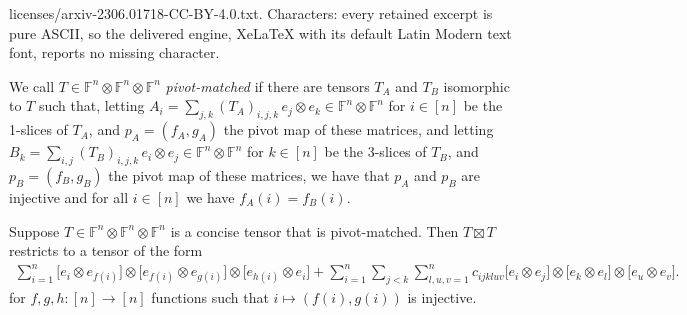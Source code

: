 \documentclass[10pt,a4paper]{amsart}
\newcommand{\FF}{\mathbb{F}}
\begin{document}
licenses/arxiv-2306.01718-CC-BY-4.0.txt. Characters: every retained excerpt is pure ASCII, so the delivered engine, XeLaTeX with its default Latin Modern text font, reports no missing character.
\begin{definition} \label{def:pivot-matched}
    We call $T\in\FF^{n}\otimes\FF^{n}\otimes\FF^{n}$ \emph{pivot-matched} if there are tensors $T_A$ and $T_B$ isomorphic 
    to $T$ such that, 
%
    letting $A_i = \sum_{j,k} (T_A)_{i,j,k}\, e_j \otimes e_k \in \FF^{n} \otimes \FF^{n}$ for $i \in [n]$ be the 1-slices of $T_A$, and $p_A=(f_A,g_A)$ the pivot map of these matrices, and
    letting $B_k = \sum_{i,j} (T_B)_{i,j,k}\, e_i \otimes e_j \in \FF^{n}\otimes \FF^{n}$ for $k \in [n]$ be the 3-slices of $T_B$, and $p_B=(f_B,g_B)$ the pivot map of these matrices, we have that $p_A$ and $p_B$ are injective and  for all $i \in [n]$ we have $f_A(i)=f_B(i)$.
%
%
%
%
%
\end{definition}

\begin{lemma}\label{lem:upper-triangular}
    Suppose $T\in\FF^n\otimes\FF^n\otimes\FF^n$ is a concise tensor that is %
    pivot-matched. 
    Then
    $T\boxtimes T$ restricts to a tensor of the form
\begin{multline}\label{eq:req-form}
\sum_{i=1}^n \big[e_i\otimes e_{f(i)}\big]\otimes\big[e_{f(i)}\otimes e_{g(i)}\big] \otimes \big[e_{h(i)}\otimes e_i\big]
+ \sum_{i=1}^n\sum_{j<k}\sum_{l,u,v=1}^n c_{ijkluv}\big[e_i\otimes e_j\big]\otimes \big[e_k\otimes e_l\big]\otimes \big[e_u\otimes e_v].
\end{multline}
for $f,g,h:[n]\to[n]$ functions such that $i\mapsto(f(i),g(i))$ is injective.
\end{lemma}
\end{document}
